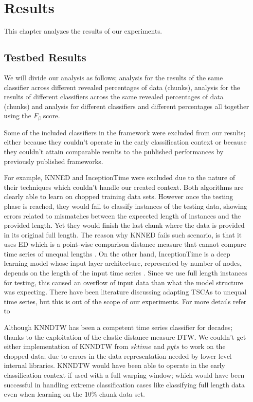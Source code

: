 \chapter{Results}
\label{ChapterResults}
This chapter analyzes the results of our experiments.


\section{Testbed Results}
\label{SectionTestbedResults}
We will divide our analysis as follows;
analysis for the results of the same classifier across different revealed percentages of data (chunks),
analysis for the results of different classifiers across the same revealed percentages of data (chunks)
and analysis for different classifiers and different percentages all together using the $F_{\beta}$ score.


Some of the included classifiers in the framework were excluded from our results; either because they couldn't operate in the early classification context
or because they couldn't attain comparable results to the published performances by previously published frameworks.

For example, KNNED and InceptionTime were excluded due to the nature of their techniques which couldn't handle our created context.
Both algorithms are clearly able to learn on chopped training data sets.
However once the testing phase is reached, they would fail to classify instances of the testing data,
showing errors related to mismatches between the expeccted length of instances and the provided length.
Yet they would finish the last chunk where the data is provided in its original full length.
The reason why KNNED fails such scenario, is that it uses ED which is a point-wise comparison distance measure that cannot compare time series of unequal lengths \cite{tan2019time}.
On the other hand, InceptionTime is a deep learning model whose input layer architecture, represented by number of nodes, depends on the length of the input time series \cite{fawaz2019deepreview}.
Since we use full length instances for testing, this caused an overflow of input data than what the model structure was expecting.
There have been literature discussing adapting TSCAs to unequal time series, but this is out of the scope of our experiments.
For more details refer to \cite{caiado2009comparison, tan2019time, fawaz2019deepreview}


Although KNNDTW has been a competent time series classifier for decades; thanks to the exploitation of the elastic distance measure DTW.
We couldn't get either implementation of KNNDTW from $sktime$ and $pyts$ to work on the chopped data; due to errors in the data representation needed by lower level internal libraries.
KNNDTW would have been able to operate in the early classification context if used with a full warping window; which would have been successful in handling extreme classification cases like classifying full length data
even when learning on the 10\% chunk data set.


